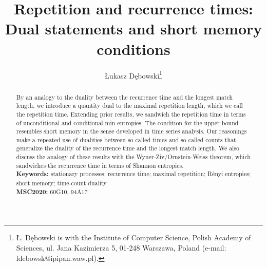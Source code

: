 \documentclass[a4paper,12pt]{article}
\author{{\L}ukasz D\k{e}bowski\thanks{
    {\L}. D\k{e}bowski is with
    the Institute of Computer Science, Polish Academy of Sciences, 
    ul. Jana Kazimierza 5, 01-248 Warszawa, Poland 
    (e-mail: ldebowsk@ipipan.waw.pl).
  }
}
\title{Repetition and recurrence times: \\ Dual statements and short
  memory conditions} \date{}
\begin{document}
\begin{titlepage}
\maketitle

\begin{abstract}
  By an analogy to the duality between the recurrence time and the
  longest match length, we introduce a quantity dual to the maximal
  repetition length, which we call the repetition time.  Extending
  prior results, we sandwich the repetition time in terms of
  unconditional and conditional min-entropies. The condition for the
  upper bound resembles short memory in the sense developed in time
  series analysis. Our reasonings make a repeated use of dualities
  between so called times and so called counts that generalize the
  duality of the recurrence time and the longest match length.  We
  also discuss the analogy of these results with the
  Wyner-Ziv/Ornstein-Weiss theorem, which sandwiches the recurrence
  time in terms of Shannon entropies.
%
  \\[1em]
  \textbf{Keywords:} stationary processes; recurrence time; maximal
  repetition; R\'enyi entropies; short memory; time-count
  duality
  \\[1em]
  \textbf{MSC2020:} 60G10, 94A17
\end{abstract}



\end{titlepage}


\end{document}
